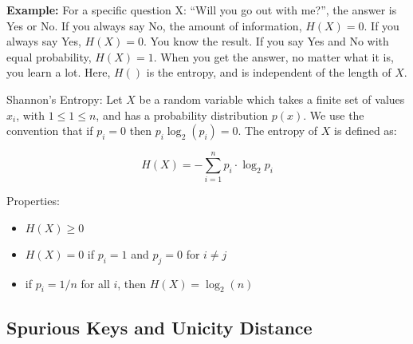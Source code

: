 \textbf{Example:} For a specific question X: ``Will you go out with me?'', the answer is Yes or No. If you always say No, the amount of information, $H(X) = 0$. If you always say Yes, $H(X) = 0$. You know the result. If you say Yes and No with equal probability, $H(X) = 1$. When you get the answer, no matter what it is, you learn a lot. Here, $H()$ is the entropy, and is independent of the length of $X$.

\begin{defn}
    Shannon's Entropy: Let $X$ be a random variable which takes a finite set of values $x_i$, with $1 \leq 1 \leq n$, and has a probability distribution $p(x)$. We use the convention that if $p_i = 0$ then $p_i \log_2(p_i) = 0$. The entropy of $X$ is defined as:

    \[ H(X) = -\sum_{i=1}^n p_i \cdot \log_2 p_i\] 

    Properties:
    \begin{itemize}
        \item $H(X) \geq 0$
        \item $H(X) = 0$ if $p_i = 1$ and $p_j = 0$ for $i \neq j$
        \item if $p_i = 1/n$ for all $i$, then $H(X) = \log_2(n)$
    \end{itemize}
\end{defn}

\subsection{Spurious Keys and Unicity Distance}
